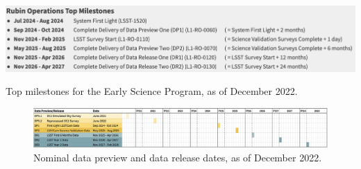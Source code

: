 \begin{table}
\label{tab:milestones}
\includegraphics[width=\linewidth]{figures/DPR-milestones}
\caption{Top milestones for the Early Science Program, as of December 2022.}
\end{table}

\begin{figure}
\includegraphics[width=\linewidth]{figures/DPR-timeline}
\caption{Nominal data preview and data release dates, as of December 2022.}
\label{fig:timeline}
\end{figure}
